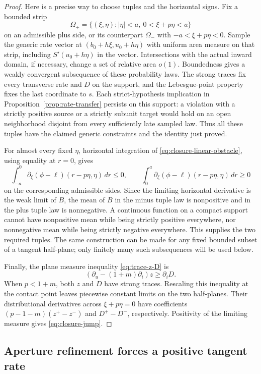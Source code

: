 \begin{proof}
Here is a precise way to choose tuples and the horizontal signs.  Fix
a bounded strip
\[
 \Omega_+=\{(\xi,\eta):|\eta|<a,\ 0<\xi+p\eta<a\}
\]
on an admissible plus side, or its counterpart $\Omega_-$ with
$-a<\xi+p\eta<0$.  Sample the generic rate vector at
$(b_0+h\xi,u_0+h\eta)$ with uniform area measure on that strip,
including $S'(u_0+h\eta)$ in the vector.  Intersections with the
actual inward domain, if necessary, change a set of relative area
$o(1)$.  Boundedness gives a weakly convergent subsequence of these
probability laws.  The strong traces fix every transverse rate and
$D$ on the support, and the Lebesgue-point property fixes the last
coordinate to $s$.  Each strict-hypothesis implication in
Proposition~\ref{prop:rate-transfer} persists on this support: a
violation with a strictly positive source or a strictly subunit target
would hold on an open neighborhood disjoint from every sufficiently
late sampled law.  Thus all these tuples have the claimed generic
constraints and the identity just proved.

For almost every fixed $\eta$, horizontal integration of
\eqref{eq:closure-linear-obstacle}, using equality at $r=0$, gives
\[
 \int_{-a}^{0}\partial_\xi(\phi-\ell)(r-p\eta,\eta)\,dr\le0,
 \qquad
 \int_{0}^{a}\partial_\xi(\phi-\ell)(r-p\eta,\eta)\,dr\ge0
\]
on the corresponding admissible sides.  Since the limiting horizontal
derivative is the weak limit of $B$, the mean of $B$ in the minus
tuple law is nonpositive and in the plus tuple law is nonnegative.
A continuous function on a compact support cannot have nonpositive
mean while being strictly positive everywhere, nor nonnegative mean
while being strictly negative everywhere.  This supplies the two
required tuples.  The same construction can be made for any fixed
bounded subset of a tangent half-plane; only finitely many such
subsequences will be used below.

Finally, the plane measure inequality \eqref{eq:trace-z-D} is
\[
 (\partial_u-(1+m)\partial_i)z\ge\partial_iD.
\]
When $p<1+m$, both $z$ and $D$ have strong traces.  Rescaling this
inequality at the contact point leaves piecewise constant limits on
the two half-planes.  Their distributional derivatives across
$\xi+p\eta=0$ have coefficients
$(p-1-m)(z^+-z^-)$ and $D^+-D^-$, respectively.  Positivity of the
limiting measure gives \eqref{eq:closure-jump}.
\end{proof}

\subsection{Aperture refinement forces a positive tangent rate}

